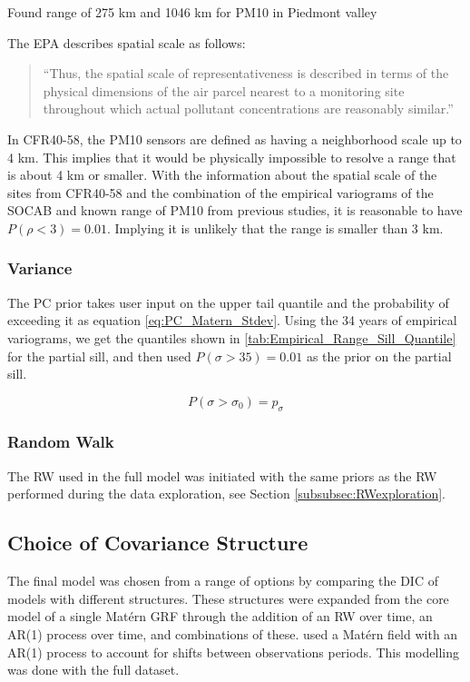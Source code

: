 \documentclass{article}
\begin{document}
\cite{cameletti2011spatio} Found range of 275 km and 1046 km for PM10 in Piedmont valley

The \ac{EPA} describes spatial scale as follows:
\begin{quote}
``Thus, the spatial scale of representativeness is described in terms of the physical dimensions of the air parcel nearest to a monitoring site throughout which actual pollutant concentrations are reasonably similar.''   \end{quote}
In CFR40-58, the \ac{PM10} sensors are defined as having a neighborhood scale up to 4 km.  This implies that it would be physically impossible to resolve a range that is about 4 km or smaller.  With the information about the spatial scale of the sites from CFR40-58 and the combination of the empirical variograms of the \ac{SOCAB} and known range of \ac{PM10} from previous studies, it is reasonable to have $P(\rho < 3) = 0.01$. Implying it is unlikely that the range is smaller than 3 km.



\subsubsection*{Variance}
\label{subsubsec:variance}
The PC prior takes user input on the upper tail quantile and the probability of exceeding it as equation \ref{eq:PC_Matern_Stdev}.  Using the 34 years of empirical variograms, we get the quantiles shown in \ref{tab:Empirical_Range_Sill_Quantile} for the partial sill, and then used $P(\sigma > 35) = 0.01$ as the prior on the partial sill.

\begin{equation}
    P(\sigma > \sigma_0) = p_{\sigma}    
\end{equation} \label{eq:PC_Matern_Stdev}

\subsubsection{Random Walk}
\label{subsubsec:ranwalk}
The \ac{RW} used in the full model was initiated with the same priors as the \ac{RW} performed during the data exploration, see Section \ref{subsubsec:RWexploration}.


\subsection{Choice of Covariance Structure}
\label{subsec:covstructchoice}
The final model was chosen from a range of options by comparing the DIC of models with different structures.  These structures were expanded from the core model of a single Mat\'{e}rn \ac{GRF} through the addition of an RW over time, an AR(1) process over time, and combinations of these.  \cite{cameletti2011spatio} used a Mat\'{e}rn field with an AR(1) process to account for shifts between observations periods.  This modelling was done with the full dataset.
\end{document}
